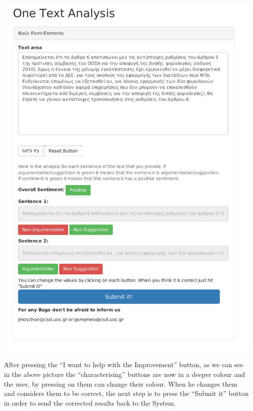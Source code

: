 \includegraphics[width=0.9\linewidth]{figure/screens/screen3_vector.pdf}

After pressing the ``I want to help with the Improvement'' button, as we can see in the above picture the ``characterising'' buttons are now in a deeper colour and the user, by pressing on them can change their colour. When he changes them and considers them to be correct, the next step is to press the ``Submit it'' button in order to send the corrected results back to the System.